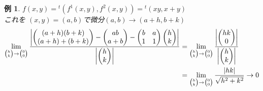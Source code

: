 \documentclass[dvipdfmx,a4j,10pt]{jsarticle}
\theoremstyle{mystyle1}
\theoremstyle{mystyle2}
\newtheorem{example}{例}
\begin{document}
\begin{example}
$f(x,y)={}^{t}(f^1(x,y),f^2(x,y))={}^{t}(xy,x+y)$\\
これを	$(x,y)=(a,b)$で微分$(a,b)\to(a+h,b+k)$
\[
\begin{split}
\lim_{
\tiny
\begin{pmatrix}
h \\
k \\
\end{pmatrix}
\to
\begin{pmatrix}
0 \\
0 \\
\end{pmatrix}}
\frac{
\left|
\begin{pmatrix}
(a+h)(b+k) \\
(a+h)+(b+k) \\
\end{pmatrix}
-
\begin{pmatrix}
ab \\
a+b \\
\end{pmatrix}
-
\begin{pmatrix}
b & a \\
1 & 1\\
\end{pmatrix}
\begin{pmatrix}
h \\
k \\
\end{pmatrix}
\right|
}
{\left|\begin{pmatrix}
h \\
k \\
\end{pmatrix}\right|}
&=
\lim_{
\tiny
\begin{pmatrix}
h \\
k \\
\end{pmatrix}
\to
\begin{pmatrix}
0 \\
0 \\
\end{pmatrix}}
\frac{\left|
\begin{pmatrix}
hk \\
0 \\
\end{pmatrix}
\right|}{\left|
\begin{pmatrix}
h \\
k \\
\end{pmatrix}
\right|}
\\
&=
\lim_{
\tiny
\begin{pmatrix}
h \\
k \\
\end{pmatrix}
\to
\begin{pmatrix}
0 \\
0 \\
\end{pmatrix}}
\frac{|hk|}{\sqrt{h^2+k^2}}\to0
\end{split}
\]
\end{example}
\end{document}
